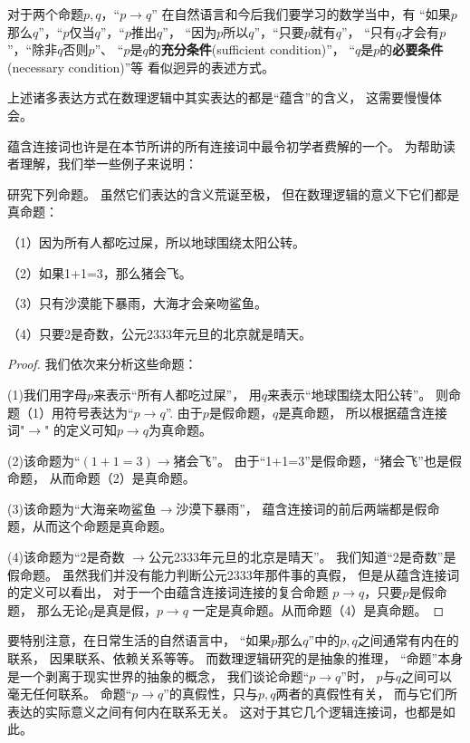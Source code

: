对于两个命题$p,q$，“$p\rightarrow q$”
在自然语言和今后我们要学习的数学当中，有
“如果$p$那么$q$”，“$p$仅当$q$”，“$p$推出$q$”，
“因为$p$所以$q$”，“只要$p$就有$q$”，
“只有$q$才会有$p$”，“除非$q$否则$p$”、
“$p$是$q$的\textbf{充分条件}(sufficient condition)”，
“$q$是$p$的\textbf{必要条件}(necessary condition)”等
看似迥异的表述方式。

上述诸多表达方式在数理逻辑中其实表达的都是“蕴含”的含义，
这需要慢慢体会。

蕴含连接词也许是在本节所讲的所有连接词中最令初学者费解的一个。
为帮助读者理解，我们举一些例子来说明：

\begin{example}研究下列命题。
虽然它们表达的含义荒诞至极，
但在数理逻辑的意义下它们都是真命题：

（1）因为所有人都吃过屎，所以地球围绕太阳公转。

（2）如果1+1=3，那么猪会飞。

（3）只有沙漠能下暴雨，大海才会亲吻鲨鱼。

（4）只要2是奇数，公元2333年元旦的北京就是晴天。
\end{example}
\begin{proof}
我们依次来分析这些命题：

(1)我们用字母$p$来表示“所有人都吃过屎”，
用$q$来表示“地球围绕太阳公转”。
则命题（1）用符号表达为“$p\rightarrow q$”.
由于$p$是假命题，$q$是真命题，
所以根据蕴含连接词"$\rightarrow$"
的定义可知$p\rightarrow q$为真命题。

(2)该命题为“$(1+1=3)\rightarrow\text{猪会飞}$”。
由于“1+1=3”是假命题，“猪会飞”也是假命题，
从而命题（2）是真命题。

(3)该命题为“大海亲吻鲨鱼$\rightarrow$沙漠下暴雨”，
蕴含连接词的前后两端都是假命题，从而这个命题是真命题。

(4)该命题为“2是奇数
$\rightarrow$公元2333年元旦的北京是晴天”。
我们知道“2是奇数”是假命题。
虽然我们并没有能力判断公元2333年那件事的真假，
但是从蕴含连接词的定义可以看出，
对于一个由蕴含连接词连接的复合命题
$p\rightarrow q$，只要$p$是假命题，
那么无论$q$是真是假，$p\rightarrow q$
一定是真命题。从而命题（4）是真命题。
\end{proof}

要特别注意，在日常生活的自然语言中，
“如果$p$那么$q$”中的$p,q$之间通常有内在的联系，
因果联系、依赖关系等等。
而数理逻辑研究的是抽象的推理，
“命题”本身是一个剥离于现实世界的抽象的概念，
我们谈论命题“$p\rightarrow q$”时，
$p$与$q$之间可以毫无任何联系。
命题“$p\rightarrow q$”的真假性，只与$p,q$两者的真假性有关，
而与它们所表达的实际意义之间有何内在联系无关。
这对于其它几个逻辑连接词，也都是如此。

